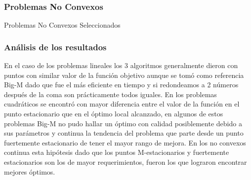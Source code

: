 \subsubsection{Problemas No Convexos}

\begin{resultstable}{Problemas No Convexos Seleccionados}
    \end{resultstable}


\subsubsection{Análisis de los resultados}
En el caso de los problemas lineales los 3 algoritmos generalmente dieron con puntos con similar valor de la función objetivo aunque 
se tomó como referencia Big-M dado que fue el más eficiente en tiempo y si redondeamos a 2 números después de la coma son prácticamente todos iguales.
En los problemas cuadráticos se encontró con mayor diferencia entre el valor de la función en el punto estacionario que en el óptimo local alcanzado, en algunos de estos problemas Big-M no pudo hallar un óptimo con calidad posiblemente debido a sus parámetros y continua la tendencia del
problema que parte desde un punto fuertemente estacionario de tener el mayor rango de mejora.
En los no convexos continua esta hipótesis dado que los puntos M-estacionarios y fuertemente estacionarios son los de mayor requerimientos, fueron los que lograron encontrar mejores óptimos. 
